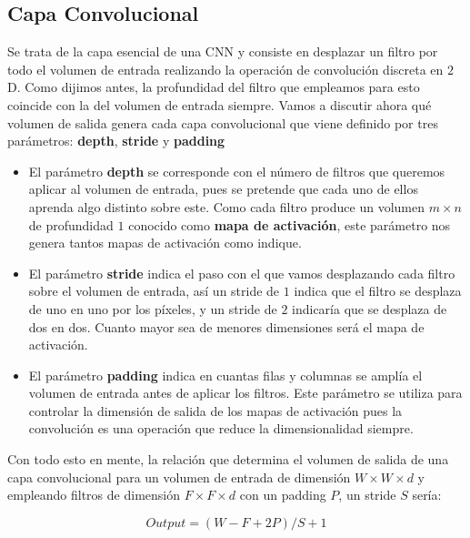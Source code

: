         \subsection{Capa Convolucional}
            \noindent Se trata de la capa esencial de una CNN y consiste en desplazar un filtro por todo el volumen de entrada realizando la operación de convolución discreta en $2$D. Como dijimos antes, la profundidad del filtro que empleamos para esto coincide con la del volumen de entrada siempre. Vamos a discutir ahora qué volumen de salida genera cada capa convolucional que viene definido por tres parámetros: \textbf{depth}, \textbf{stride} y \textbf{padding}

            \begin{itemize}
                \item El parámetro \textbf{depth} se corresponde con el número de filtros que queremos aplicar al volumen de entrada, pues se pretende que cada uno de ellos aprenda algo distinto sobre este. Como cada filtro produce un volumen $m \times n$ de profundidad $1$ conocido como \textbf{mapa de activación}, este parámetro nos genera tantos mapas de activación como indique.
                \item El parámetro \textbf{stride} indica el paso con el que vamos desplazando cada filtro sobre el volumen de entrada, así un stride de $1$ indica que el filtro se desplaza de uno en uno por los píxeles, y un stride de $2$ indicaría que se desplaza de dos en dos. Cuanto mayor sea de menores dimensiones será el mapa de activación.
                \item El parámetro \textbf{padding} indica en cuantas filas y columnas se amplía el volumen de entrada antes de aplicar los filtros. Este parámetro se utiliza para controlar la dimensión de salida de los mapas de activación pues la convolución es una operación que reduce la dimensionalidad siempre.
            \end{itemize}

            \noindent Con todo esto en mente, la relación que determina el volumen de salida de una capa convolucional para un volumen de entrada de dimensión $W \times W \times d$ y empleando filtros de dimensión $F \times F \times d$ con un padding $P$, un stride $S$ sería: 

            \begin{equation}
                Output=(W-F + 2P)/S + 1
            \end{equation}

            \medskip
            
